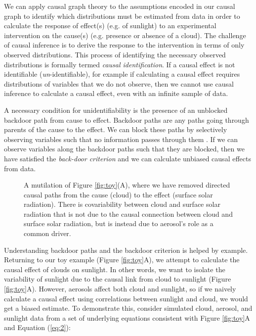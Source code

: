 \documentclass[12pt]{article}
\begin{document}
We can apply causal graph theory
\citep[e.g.,][]{pearl1995causal,shpitser2006} to the assumptions
encoded in our causal graph to identify which distributions must be
estimated from data in order to calculate the response of effect(s)
(e.g. of sunlight) to an experimental intervention on the cause(s)
(e.g. presence or absence of a cloud). The challenge of causal
inference is to derive the response to the intervention in terms of
only observed distributions. This process of identifying the necessary
observed distributions is formally termed \emph{causal
  identification}. If a causal effect is not identifiable
(\emph{un}-identifiable), for example if calculating a causal effect
requires distributions of variables that we do not observe, then we
cannot use causal inference to calculate a causal effect, even with an
infinite sample of data.


A necessary condition for unidentifiability is the presence of an
unblocked backdoor path from cause to effect. Backdoor paths are any
paths going through parents of the cause to the effect. We can block
these paths by selectively observing variables such that no
information passes through them \citep{geiger-d-sep}. If we can
observe variables along the backdoor paths such that they are blocked,
then we have satisfied the \emph{back-door criterion}
\citep{pearl2009} and we can calculate unbiased causal effects from
data.

\begin{figure}
  
  \caption{A mutilation of Figure \ref{fig:toy}(A), where we have
    removed directed causal paths from the cause (cloud) to the effect
    (surface solar radiation). There is covariability between cloud
    and surface solar radiation that is not due to the causal
    connection between cloud and surface solar radiation, but is
    instead due to aerosol's role as a common driver.}
  \label{fig:mutilated-toy}
\end{figure}

Understanding backdoor paths and the backdoor criterion is helped by
example. Returning to our toy example (Figure \ref{fig:toy}A), we
attempt to calculate the causal effect of clouds on sunlight. In other
words, we want to isolate the variability of sunlight due to the
causal link from cloud to sunlight (Figure \ref{fig:toy}A). However,
aerosols affect both cloud and sunlight, so if we naively calculate a
causal effect using correlations between sunlight and cloud, we would
get a biased estimate. To demonstrate this, consider simulated cloud,
aerosol, and sunlight data from a set of underlying equations
consistent with Figure \ref{fig:toy}A and Equation (\ref{eq:2}):
\end{document}
